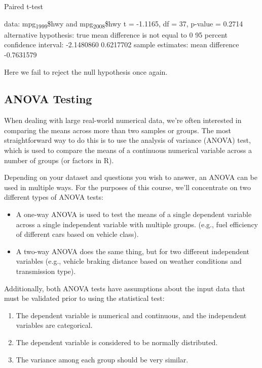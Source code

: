 \documentclass[11pt]{article}
\begin{document}
\begin{org}


Paired t-test

data:  mpg\textsubscript{1999}\$hwy and mpg\textsubscript{2008}\$hwy
t = -1.1165, df = 37, p-value = 0.2714
alternative hypothesis: true mean difference is not equal to 0
95 percent confidence interval:
 -2.1480860  0.6217702
sample estimates:
mean difference
     -0.7631579
\end{org}

Here we fail to reject the null hypothesis once again.

\subsection{ANOVA Testing}
\label{sec:org15b4bee}

When dealing with large real-world numerical data, we're often interested in comparing the means across more than two samples or groups. The most straightforward way to do this is to use the analysis of variance (ANOVA) test, which is used to compare the means of a continuous numerical variable across a number of groups (or factors in R).

Depending on your dataset and questions you wish to answer, an ANOVA can be used in multiple ways. For the purposes of this course, we'll concentrate on two different types of ANOVA tests:

\begin{itemize}
\item A one-way ANOVA is used to test the means of a single dependent variable across a single independent variable with multiple groups. (e.g., fuel efficiency of different cars based on vehicle class).
\item A two-way ANOVA does the same thing, but for two different independent variables (e.g., vehicle braking distance based on weather conditions and transmission type).
\end{itemize}

Additionally, both ANOVA tests have assumptions about the input data that must be validated prior to using the statistical test:

\begin{enumerate}
\item The dependent variable is numerical and continuous, and the independent variables are categorical.
\item The dependent variable is considered to be normally distributed.
\item The variance among each group should be very similar.
\end{enumerate}
\end{document}
